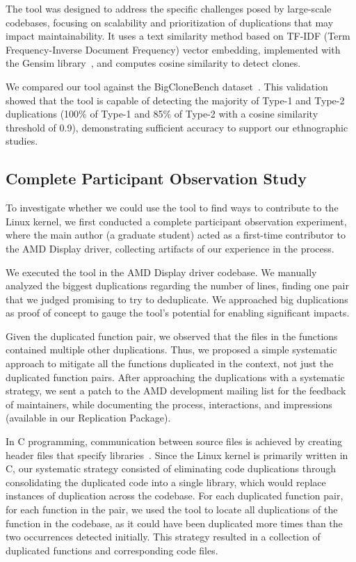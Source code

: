 \documentclass[sigconf]{acmart}
\begin{document}
The tool was designed to address the specific challenges posed by large-scale codebases, focusing on scalability and prioritization of duplications that may impact maintainability. It uses a text similarity method based on TF-IDF (Term Frequency-Inverse Document Frequency) vector embedding, implemented with the Gensim library~\cite{gensim}, and computes cosine similarity to detect clones.

We compared our tool against the BigCloneBench dataset~\cite{bigclonebench}. This validation showed that the tool is capable of detecting the majority of Type-1 and Type-2 duplications (100\% of Type-1 and 85\% of Type-2 with a cosine similarity threshold of 0.9), demonstrating sufficient accuracy to support our ethnographic studies.

\subsection{Complete Participant Observation Study}
\label{sec:participant}

To investigate whether we could use the tool to find ways to contribute to the Linux kernel, we first conducted a complete participant observation experiment, where the main author (a graduate student) acted as a first-time contributor to the AMD Display driver, collecting artifacts of our experience in the process.

We executed the tool in the AMD Display driver codebase. We manually analyzed the biggest duplications regarding the number of lines, finding one pair that we judged promising to try to deduplicate. We approached big duplications as proof of concept to gauge the tool's potential for enabling significant impacts.

Given the duplicated function pair, we observed that the files in the functions contained multiple other duplications. Thus, we proposed a simple systematic approach to mitigate all the functions duplicated in the context, not just the duplicated function pairs. After approaching the duplications with a systematic strategy, we sent a patch to the AMD development mailing list for the feedback of maintainers, while documenting the process, interactions, and impressions (available in our Replication Package).

In C programming, communication between source files is achieved by creating header files that specify libraries~\cite{Cbook}. Since the Linux kernel is primarily written in C, our systematic strategy consisted of eliminating code duplications through consolidating the duplicated code into a single library, which would replace instances of duplication across the codebase. For each duplicated function pair, for each function in the pair, we used the tool to locate all duplications of the function in the codebase, as it could have been duplicated more times than the two occurrences detected initially. This strategy resulted in a collection of duplicated functions and corresponding code files.
\end{document}
